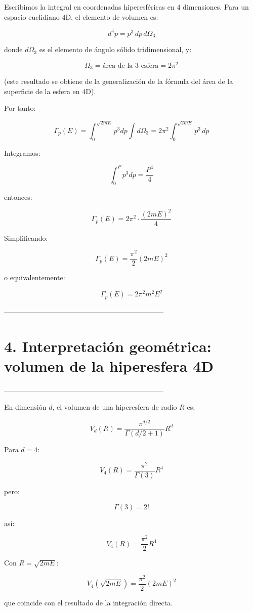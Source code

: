\documentclass{article}
\begin{document}
Escribimos la integral en coordenadas hiperesféricas en 4 dimensiones.  
Para un espacio euclidiano 4D, el elemento de volumen es:

\[
d^{4}p = p^{3} \, dp \, d\Omega_{3}
\]

donde \(d\Omega_{3}\) es el elemento de ángulo sólido tridimensional, y:

\[
\Omega_{3}
= \text{área de la 3-esfera}
= 2\pi^{2}
\]

(este resultado se obtiene de la generalización de la fórmula del área de la
superficie de la esfera en 4D).

Por tanto:

\[
\Gamma_{p}(E)
= \int_{0}^{\sqrt{2mE}} p^{3}dp \int d\Omega_{3}
= 2\pi^{2} \int_{0}^{\sqrt{2mE}} p^{3} \, dp
\]

Integramos:

\[
\int_{0}^{P} p^{3} dp = \frac{P^{4}}{4}
\]

entonces:

\[
\Gamma_{p}(E)
= 2\pi^{2}\cdot \frac{(2mE)^{2}}{4}
\]

Simplificando:

\[
\boxed{
\Gamma_{p}(E) = \frac{\pi^{2}}{2}(2mE)^{2}
}
\]

o equivalentemente:

\[
\Gamma_{p}(E)=2\pi^{2}m^{2}E^{2}
\]

--------------------------------------------------------------------
\section*{\textcolor{Apple Green}{4. Interpretación geométrica: volumen de la hiperesfera 4D}}
--------------------------------------------------------------------

En dimensión \(d\), el volumen de una hiperesfera de radio \(R\) es:

\[
V_{d}(R)=\frac{\pi^{d/2}}{\Gamma(d/2+1)}R^{d}
\]

Para \(d=4\):

\[
V_{4}(R)=\frac{\pi^{2}}{\Gamma(3)}R^{4}
\]

pero:

\[
\Gamma(3)=2!
\]

así:

\[
V_{4}(R)=\frac{\pi^{2}}{2}R^{4}
\]

Con \(R=\sqrt{2mE}\):

\[
V_{4}(\sqrt{2mE})
= \frac{\pi^{2}}{2}(2mE)^{2}
\]

que coincide con el resultado de la integración directa.
\end{document}
